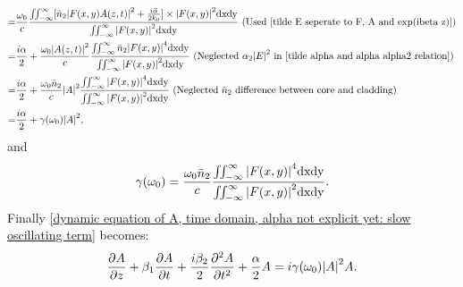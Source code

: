 \documentclass[12pt]{extarticle}
\numberwithin{equation}{section}
\numberwithin{figure}{section}
\numberwithin{table}{section}
\newcommand{\<}{\langle}
\renewcommand{\>}{\rangle}
\theoremstyle{definition}
\begin{document}
\begin{itemize}
{\begin{equation}
\begin{split}
                    =&\frac{\omega_0}{c} \frac{\iint_{-\infty}^\infty [\Bar{n}_2\abs{F(x,y)A(z,t)}^2+\frac{i\Tilde{\alpha}}{2k_0}] \times \abs{F(x,y)}^2 \mathrm{dxdy}}{\iint_{-\infty}^\infty \abs{F(x,y)}^2 \mathrm{dxdy}} \mbox{ (Used \autoref{tilde E seperate to F, A and exp(ibeta z)})}\\
                    =&\frac{i\alpha}{2}+\frac{\omega_0\abs{A(z,t)}^2}{c} \frac{\iint_{-\infty}^\infty \Bar{n}_2 \abs{F(x,y)}^4 \mathrm{dxdy}}{\iint_{-\infty}^\infty \abs{F(x,y)}^2 \mathrm{dxdy}} \mbox{ (Neglected $\alpha_2\abs{E}^2$ in \autoref{tilde alpha and alpha alpha2 relation})}\\
                    =&\frac{i\alpha}{2}+\frac{\omega_0\Bar{n}_2}{c}\abs{A}^2 \frac{\iint_{-\infty}^\infty  \abs{F(x,y)}^4 \mathrm{dxdy}}{\iint_{-\infty}^\infty \abs{F(x,y)}^2 \mathrm{dxdy}} \mbox{ (Neglected $\Bar{n}_2$ difference between core and cladding)}\\
                    =&\frac{i\alpha}{2}+\gamma(\omega_0)\abs{A}^2,
                    \label{Delta beta omega 0 expression as F(x,y) intergral}                    
                \end{split}
                \end{equation}
                and
                \begin{equation}
                    \gamma(\omega_0) = \frac{\omega_0\Bar{n}_2}{c} \frac{\iint_{-\infty}^\infty  \abs{F(x,y)}^4 \mathrm{dxdy}}{\iint_{-\infty}^\infty \abs{F(x,y)}^2 \mathrm{dxdy}}.
                    \label{gamma omega0 relation in intergral of F(x,y) form}
                \end{equation}
                Finally \autoref{dynamic equation of A, time domain, alpha not explicit yet: slow oscillating term} becomes:
                \begin{equation}
                    \pdv{A}{z}+\beta_1\pdv{A}{t}+\frac{i\beta_2}{2}\pdv[2]{A}{t}+\frac{\alpha}{2}A=i\gamma(\omega_0) \abs{A}^2 A.
                    \label{dynamic equation of A, time domain, alpha explicit: slow oscillating term}
                \end{equation}
            }
            

\end{itemize}
\end{document}
